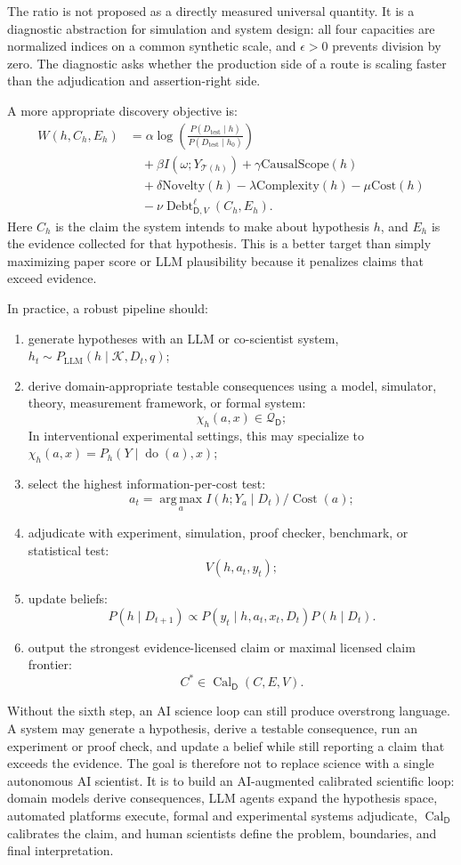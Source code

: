 \documentclass[11pt,a4paper]{article}
\newcommand{\doop}{\operatorname{do}}
\newcommand{\argmax}{\operatorname*{arg\,max}}
\newcommand{\Know}{\mathcal{K}}
\newcommand{\Cal}{\operatorname{Cal}}
\newcommand{\Cost}{\operatorname{Cost}}
\newcommand{\Debt}{\operatorname{Debt}}
\newcommand{\Dom}{\mathsf{D}}
\begin{document}
The ratio is not proposed as a directly measured universal quantity. It is a diagnostic abstraction for simulation and system design: all four capacities are normalized indices on a common synthetic scale, and $\epsilon>0$ prevents division by zero. The diagnostic asks whether the production side of a route is scaling faster than the adjudication and assertion-right side.

A more appropriate discovery objective is:
\begin{equation}
\begin{aligned}
W(h,C_h,E_h)
&=\alpha\log
\left(
\frac{P(D_{\mathrm{test}}\mid h)}
{P(D_{\mathrm{test}}\mid h_0)}
\right)\\
&\quad+\beta I(\omega;Y_{\mathcal{T}(h)})
+\gamma\mathrm{CausalScope}(h)\\
&\quad+\delta\mathrm{Novelty}(h)
-\lambda\mathrm{Complexity}(h)
-\mu\mathrm{Cost}(h)\\
&\quad-\nu\Debt^\ell_{\Dom,V}(C_h,E_h).
\end{aligned}
\end{equation}
Here $C_h$ is the claim the system intends to make about hypothesis $h$, and $E_h$ is the evidence collected for that hypothesis. This is a better target than simply maximizing paper score or LLM plausibility because it penalizes claims that exceed evidence.

In practice, a robust pipeline should:
\begin{enumerate}
  \item generate hypotheses with an LLM or co-scientist system, $h_t\sim P_{\mathrm{LLM}}(h\mid \Know,D_t,q)$;
  \item derive domain-appropriate testable consequences using a model, simulator, theory, measurement framework, or formal system:
  \[
    \chi_h(a,x)\in\mathcal{Q}_{\Dom};
  \]
  In interventional experimental settings, this may specialize to $\chi_h(a,x)=P_h(Y\mid \doop(a),x)$;
  \item select the highest information-per-cost test:
  \[
    a_t=\argmax_a I(h;Y_a\mid D_t)/\Cost(a);
  \]
  \item adjudicate with experiment, simulation, proof checker, benchmark, or statistical test:
  \[
    V(h,a_t,y_t);
  \]
  \item update beliefs:
  \[
    P(h\mid D_{t+1})\propto P(y_t\mid h,a_t,x_t,D_t)P(h\mid D_t).
  \]
  \item output the strongest evidence-licensed claim or maximal licensed claim frontier:
  \[
    C^\ast\in\Cal_{\Dom}(C,E,V).
  \]
\end{enumerate}
Without the sixth step, an AI science loop can still produce overstrong language. A system may generate a hypothesis, derive a testable consequence, run an experiment or proof check, and update a belief while still reporting a claim that exceeds the evidence. The goal is therefore not to replace science with a single autonomous AI scientist. It is to build an AI-augmented calibrated scientific loop: domain models derive consequences, LLM agents expand the hypothesis space, automated platforms execute, formal and experimental systems adjudicate, $\Cal_{\Dom}$ calibrates the claim, and human scientists define the problem, boundaries, and final interpretation.
\end{document}
